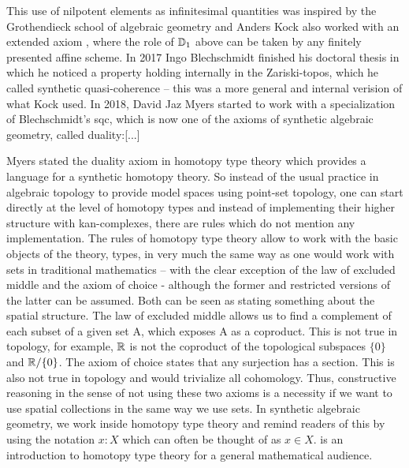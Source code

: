 \documentclass{../util/zariski}
\begin{document}
This use of nilpotent elements as infinitesimal quantities was inspired by the Grothendieck school of algebraic geometry and Anders Kock also worked with an extended axiom \cite{Kock74}, where the role of $\mathbb{D}_1$ above can be taken by any finitely presented affine scheme. In 2017 Ingo Blechschmidt finished his doctoral thesis in which he noticed a property holding internally in the Zariski-topos, which he called synthetic quasi-coherence -- this was a more general and internal verision of what Kock used. In 2018, David Jaz Myers started to work with a specialization of Blechschmidt's sqc, which is now one of the axioms of synthetic algebraic geometry, called duality:[...]

Myers stated the duality axiom in homotopy type theory which provides a language for a synthetic homotopy theory.
So instead of the usual practice in algebraic topology to provide model spaces using point-set topology, one can start directly at the level of homotopy types and instead of implementing their higher structure with kan-complexes, there are rules which do not mention any implementation.
The rules of homotopy type theory allow to work with the basic objects of the theory, types, in very much the same way as one would work with sets in traditional mathematics -- with the clear exception of the law of excluded middle and the axiom of choice - although the former and restricted versions of the latter can be assumed.
Both can be seen as stating something about the spatial structure. The law of excluded middle allows us to find a complement of each subset of a given set A, which exposes A as a coproduct.
This is not true in topology, for example, $\mathbb{R}$ is not the coproduct of the topological subspaces $\{0\}$ and $\mathbb{R}/\{0\}$.
The axiom of choice states that any surjection has a section. This is also not true in topology and would trivialize all cohomology.
Thus, constructive reasoning in the sense of not using these two axioms is a necessity if we want to use spatial collections in the same way we use sets.
In synthetic algebraic geometry, we work inside homotopy type theory and remind readers of this by using the notation $x:X$ which can often be thought of as $x\in X$.
\cite{shulman-logic-of-spaces} is an introduction to homotopy type theory for a general mathematical audience.
\end{document}
